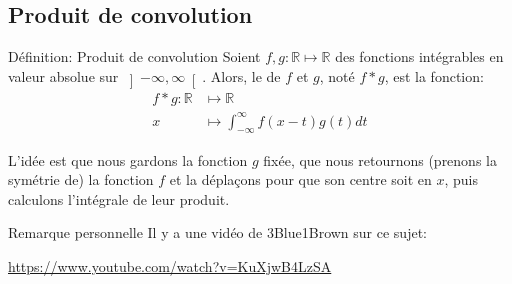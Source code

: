 \documentclass[a4paper]{article}
\begin{document}
\subsection{Produit de convolution}
\begin{parag}{Définition: Produit de convolution}
    Soient $f, g : \mathbb{R} \mapsto \mathbb{R}$ des fonctions intégrables en valeur absolue sur $\left]-\infty, \infty\right[ $. Alors, le  de $f$ et $g$, noté $f * g$, est la fonction:
    \[\begin{split}
    f * g: \mathbb{R} &\longmapsto \mathbb{R} \\
    x &\longmapsto \int_{-\infty}^{\infty} f\left(x - t\right)g\left(t\right)dt
    \end{split}\]

    L'idée est que nous gardons la fonction $g$ fixée, que nous retournons (prenons la symétrie de) la fonction $f$ et la déplaçons pour que son centre soit en $x$, puis calculons l'intégrale de leur produit.

    \begin{subparag}{Remarque personnelle}
        Il y a une vidéo de 3Blue1Brown sur ce sujet:
        \begin{center}
            \url{https://www.youtube.com/watch?v=KuXjwB4LzSA}
        \end{center}
    \end{subparag}
\end{parag}
\end{document}
